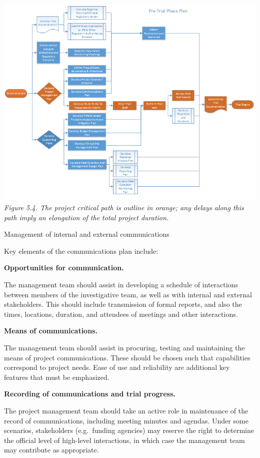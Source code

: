 \documentclass[]{book}
\begin{document}
\includegraphics{images/book/pm4.png} \emph{Figure 5.4. The project
critical path is outline in orange; any delays along this path imply an
elongation of the total project duration. }

Management of internal and external communications

Key elements of the communications plan include:

\textbf{Opportunities for communication. }

The management team should assist in developing a schedule of
interactions between members of the investigative team, as well as with
internal and external stakeholders. This should include transmission of
formal reports, and also the times, locations, duration, and attendees
of meetings and other interactions.

\textbf{Means of communications.}

The management team should assist in procuring, testing and maintaining
the means of project communications. These should be chosen such that
capabilities correspond to project needs. Ease of use and reliability
are additional key features that must be emphasized.

\textbf{Recording of communications and trial progress. }

The project management team should take an active role in maintenance of
the record of communications, including meeting minutes and agendas.
Under some scenarios, stakeholders (e.g.~funding agencies) may reserve
the right to determine the official level of high-level interactions, in
which case the management team may contribute as appropriate.
\end{document}
